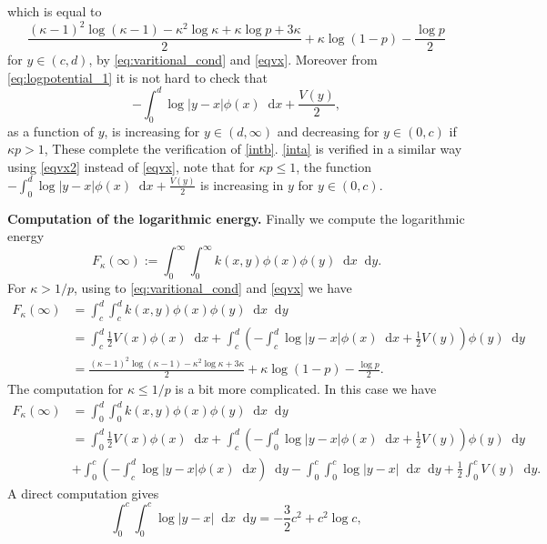 \documentclass[reqno,11pt]{amsart}
\numberwithin{equation}{section}
\theoremstyle{definition}
\newcommand*\diff{\mathop{}\!\mathrm{d}}
\begin{document}
which is equal to $$\displaystyle \frac{(\kappa-1)^2\log (\kappa-1)-\kappa^2 \log \kappa+\kappa \log p+3\kappa}{2}+\kappa \log(1-p)-\frac{\log p}{2}$$ for $y\in (c,d)$, by \eqref{eq:varitional_cond} and \eqref{eqvx}.  Moreover from \eqref{eq:logpotential_1} it is not hard to check that $$\displaystyle -\int_0^d \log|y-x|\phi(x)\diff x+\frac{V(y)}{2},$$ as a function of $y$, is increasing for $y\in (d,\infty)$ and decreasing for $y\in (0,c)$ if $\kappa p>1$, These complete the verification of \eqref{intb}. \eqref{inta} is verified in a similar way using \eqref{eqvx2} instead of \eqref{eqvx}, note that for $\kappa p\leq 1$, the function $\displaystyle -\int_0^d \log|y-x|\phi(x)\diff x+\frac{V(y)}{2}$ is increasing in $y$ for $y\in (0,c)$.

\medskip

\noindent\textbf{Computation of the logarithmic energy.}
Finally we compute the logarithmic energy
\begin{equation*}
    F_\kappa(\infty):=\int_0^\infty\int_0^\infty k(x,y)\phi(x)\phi(y)\diff x\diff y.
\end{equation*}
For $\kappa >1/p$, using to \eqref{eq:varitional_cond} and \eqref{eqvx} we have 
    \begin{align*}
        F_\kappa(\infty)&=\int_c^d\int_c^d k(x,y)\phi(x)\phi(y)\diff x\diff y\\
        &= \int_c^d \frac{1}{2} V(x)\phi(x)\diff x+\int_c^d \left(-\int_c^d \log|y-x|\phi(x)\diff x +\frac{1}{2}V(y)\right)\phi(y)\diff y\\
        &=  \frac{(\kappa-1)^2\log (\kappa-1)-\kappa^2 \log \kappa+3\kappa}{2}+\kappa \log(1-p)-\frac{\log p}{2}.
    \end{align*}
The computation for $\kappa\leq 1/p$ is a bit more complicated. In this case we have 
\begin{align*}
        F_\kappa(\infty)&=\int_0^d\int_0^d k(x,y)\phi(x)\phi(y)\diff x\diff y\\
        &= \int_0^d \frac{1}{2} V(x)\phi(x)\diff x+\int_c^d \left(-\int_0^d \log|y-x|\phi(x)\diff x +\frac{1}{2}V(y)\right)\phi(y)\diff y\\
        &+\int_0^c\left(-\int_c^d \log|y-x|\phi(x)\diff x\right)\diff y-\int_0^c\int_0^c\log|y-x|\diff x\diff y+\frac{1}{2}\int_0^c V(y)\diff y.
    \end{align*}
A direct computation gives 
\begin{equation}\label{eq:I3}
    \int_0^c\int_0^c\log|y-x|\diff x\diff y = -\frac{3}{2}c^2+c^2\log c,
\end{equation}
\end{document}
